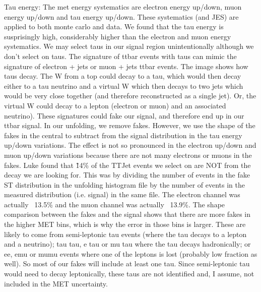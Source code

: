 Tau energy: The met energy systematics are electron energy up/down, muon energy up/down and tau energy
up/down. These systematics (and JES) are applied to both monte carlo and data. We found that the tau energy is
susprisingly high, considerably higher than the electron and muon energy systematics. We may select taus in
our signal region unintentionally although we don't select on taus. The signature of ttbar events with taus
can mimic the signature of electron + jets or muon + jets ttbar events. The image shows how taus decay. The W
from a top could decay to a tau, which would then decay either to a tau neutrino and a virtual W which then
decays to two jets which would be very close together (and therefore reconstructed as a single jet). Or, the
virtual W could decay to a lepton (electron or muon) and an associated neutrino). These signatures could fake
our signal, and therefore end up in our ttbar signal. In our unfolding, we remove fakes. However, we use the
shape of the fakes in the central to subtract from the signal distribution in the tau energy up/down
variations. The effect is not so pronounced in the electron up/down and muon up/down variations because there
are not many electrons or muons in the fakes. Luke found that \~14\% of the TTJet events we select on are NOT
from the decay we are looking for. This was by dividing the number of events in the fake ST distribution in
the unfolding histogram file by the number of events in the measured distribution (i.e. signal) in the same
file. The electron channel was actually ~13.5\% and the muon channel was actually ~13.9\%. The shape
comparison between the fakes and the signal shows that there are more fakes in the higher MET bins, which is
why the error in those bins is larger. These are likely to come from semi-leptonic tau events (where the tau
decays to a lepton and a neutrino); tau tau, e tau or mu tau where the tau decays hadronically; or ee, emu or mumu events where one of the leptons is lost (probably low fraction as well). So most of our fakes will include at least one tau. Since semi-leptonic tau would need to
decay leptonically, these taus are not identified and, I assume, not included in the MET uncertainty.

